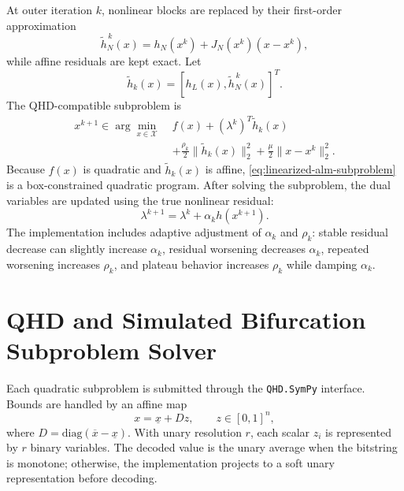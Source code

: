 \documentclass[journal]{IEEEtran}
\begin{document}
At outer iteration $k$, nonlinear blocks are replaced by their first-order approximation
\begin{equation}
    \widetilde h_N^{\,k}(x)=h_N(x^k)+J_N(x^k)(x-x^k),
\end{equation}
while affine residuals are kept exact. Let
\begin{equation}
    \widetilde h_k(x)=\left[h_L(x),\widetilde h_N^{\,k}(x)\right]^T .
\end{equation}
The QHD-compatible subproblem is
\begin{equation}
\label{eq:linearized-alm-subproblem}
\begin{aligned}
x^{k+1}\in\arg\min_{x\in\mathcal X}\;&
 f(x)+(\lambda^k)^T\widetilde h_k(x)\\
&+\frac{\rho_k}{2}\|\widetilde h_k(x)\|_2^2
 +\frac{\mu}{2}\|x-x^k\|_2^2 .
\end{aligned}
\end{equation}
Because $f(x)$ is quadratic and $\widetilde h_k(x)$ is affine, \eqref{eq:linearized-alm-subproblem} is a box-constrained quadratic program. After solving the subproblem, the dual variables are updated using the true nonlinear residual:
\begin{equation}
    \lambda^{k+1}=\lambda^k+\alpha_k h(x^{k+1}).
\end{equation}
The implementation includes adaptive adjustment of $\alpha_k$ and $\rho_k$: stable residual decrease can slightly increase $\alpha_k$, residual worsening decreases $\alpha_k$, repeated worsening increases $\rho_k$, and plateau behavior increases $\rho_k$ while damping $\alpha_k$.

\section{QHD and Simulated Bifurcation Subproblem Solver}
Each quadratic subproblem is submitted through the \texttt{QHD.SymPy} interface. Bounds are handled by an affine map
\begin{equation}
    x=\underline{x}+D z,\qquad z\in[0,1]^n,
\end{equation}
where $D=\mathrm{diag}(\overline{x}-\underline{x})$. With unary resolution $r$, each scalar $z_i$ is represented by $r$ binary variables. The decoded value is the unary average when the bitstring is monotone; otherwise, the implementation projects to a soft unary representation before decoding.
\end{document}
